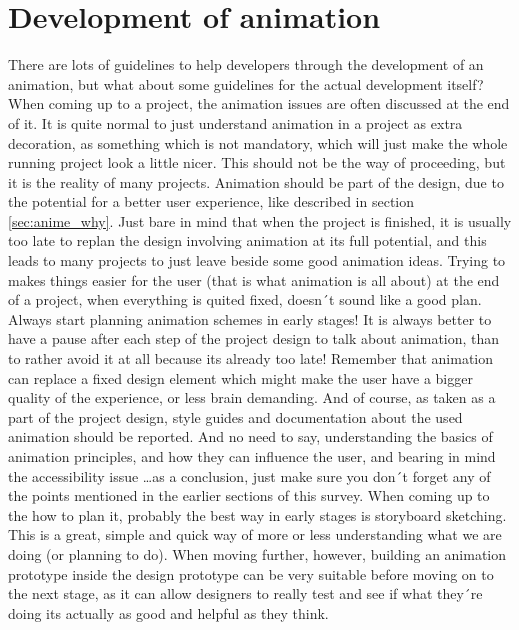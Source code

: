 \section{Development of animation} %
\label{sec:anime_dev}

There are lots of guidelines to help developers through the development of an animation, but what about some guidelines for the actual development itself? When coming up to a project, the animation issues are often discussed at the end of it. It is quite normal to just understand animation in a project as extra decoration, as something which is not mandatory, which will just make the whole running project look a little nicer. This should not be the way of proceeding, but it is the reality of many projects. Animation should be part of the design, due to the potential for a better user experience, like described in section \ref{sec:anime_why}. Just bare in mind that when the project is finished, it is usually too late to replan the design involving animation at its full potential, and this leads to many projects to just leave beside some good animation ideas.
Trying to makes things easier for the user (that is what animation is all about) at the end of a project, when everything is quited fixed, doesn´t sound like a good plan. Always start planning animation schemes in early stages! It is always better to have a pause after each step of the project design to talk about animation, than to rather avoid it at all because its already too late! Remember that animation can replace a fixed design element which might make the user have a bigger quality of the experience, or less brain demanding. And of course, as taken as a part of the project design, style guides and documentation about the used animation should be reported. And no need to say, understanding the basics of animation principles, and how they can influence the user, and bearing in mind the accessibility issue \ldots as a conclusion, just make sure you don´t forget any of the points mentioned in the earlier sections of this survey. When coming up to the how to plan it, probably the best way in early stages is storyboard sketching. This is a great, simple and quick way of more or less understanding what we are doing (or planning to do). When moving further, however, building an animation prototype inside the design prototype can be very suitable before moving on to the next stage, as it can allow designers to really test and see if what they´re doing its actually as good and helpful as they think.


